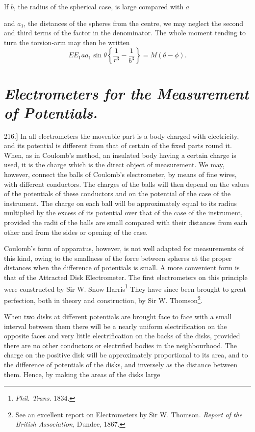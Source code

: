 \documentclass[11pt,a4paper]{article}
\begin{document}
If $b$, the radius of the spherical case, is large compared with $a$

\clearpage

and $a_1$, the distances of the spheres from the centre, we may neglect
the second and third terms of the factor in the denominator. The
whole moment tending to turn the torsion-arm may then be written
\[
EE_1aa_1\sin\theta\left\{\frac{1}{r^3}-\frac{1}{b^3}\right\}
=M(\theta-\phi).
\]

\section*{\textit{Electrometers for the Measurement of Potentials.}}

216.] In all electrometers the moveable part is a body charged
with electricity, and its potential is different from that of certain
of the fixed parts round it. When, as in Coulomb's method, an
insulated body having a certain charge is used, it is the charge
which is the direct object of measurement. We may, however,
connect the balls of Coulomb's electrometer, by means of fine wires,
with different conductors. The charges of the balls will then depend
on the values of the potentials of these conductors and on the
potential of the case of the instrument. The charge on each ball
will be approximately equal to its radius multiplied by the excess
of its potential over that of the case of the instrument, provided
the radii of the balls are small compared with their distances from
each other and from the sides or opening of the case.

Coulomb's form of apparatus, however, is not well adapted for
measurements of this kind, owing to the smallness of the force
between spheres at the proper distances when the difference of
potentials is small. A more convenient form is that of the Attracted
Disk Electrometer. The first electrometers on this principle were
constructed by Sir W. Snow Harris\setcounter{footnote}{0}\footnote{\textit{Phil. Trans.} 1834.}
They have since been brought to great perfection, both in theory
and construction, by Sir W. Thomson\footnote{See an excellent report
on Electrometers by Sir W. Thomson. \textit{Report of the British
Association}, Dundee, 1867.}.

When two disks at different potentials are brought face to face
with a small interval between them there will be a nearly uniform
electrification on the opposite faces and very little electrification
on the backs of the disks, provided there are no other conductors
or electrified bodies in the neighbourhood. The charge on the
positive disk will be approximately proportional to its area, and to
the difference of potentials of the disks, and inversely as the distance
between them. Hence, by making the areas of the disks large
\end{document}
